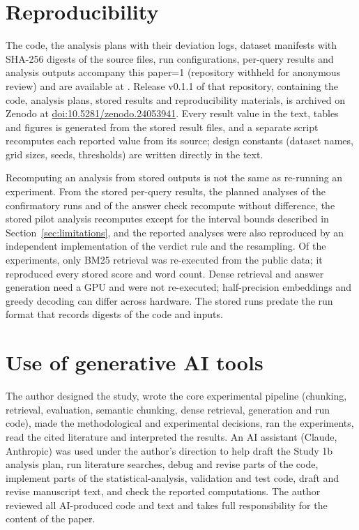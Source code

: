 \documentclass[11pt]{article}
\providecommand{\AnonymousSubmission}{0}
\newcommand*{\CodeURL}{}
\newcommand*{\CodeURL}{https://github.com/swaroopchandjc/rag-research}
\newcommand*{\ArchiveDOI}{10.5281/zenodo.24053941}
\begin{document}
\section{Reproducibility}\label{sec:reproducibility}
The code, the analysis plans with their deviation logs, dataset manifests with SHA-256 digests of the source files, run configurations, per-query results and analysis outputs accompany this paper\ifnum\AnonymousSubmission=1{} (repository withheld for anonymous review)\else{} and are available at \url{\CodeURL}. Release v0.1.1 of that repository, containing the code, analysis plans, stored results and reproducibility materials, is archived on Zenodo at \href{https://doi.org/\ArchiveDOI}{doi:\ArchiveDOI}\fi. Every result value in the text, tables and figures is generated from the stored result files, and a separate script recomputes each reported value from its source; design constants (dataset names, grid sizes, seeds, thresholds) are written directly in the text.

Recomputing an analysis from stored outputs is not the same as re-running an experiment. From the stored per-query results, the planned analyses of the confirmatory runs and of the answer check recompute without difference, the stored pilot analysis recomputes except for the \PilotBounds{} interval bounds described in Section~\ref{sec:limitations}, and the reported analyses were also reproduced by an independent implementation of the verdict rule and the resampling. Of the experiments, only BM25 retrieval was re-executed from the public data; it reproduced every stored score and word count. Dense retrieval and answer generation need a GPU and were not re-executed; half-precision embeddings and greedy decoding can differ across hardware. The stored runs predate the run format that records digests of the code and inputs.

\section*{Use of generative AI tools}
The author designed the study, wrote the core experimental pipeline (chunking, retrieval, evaluation, semantic chunking, dense retrieval, generation and run code), made the methodological and experimental decisions, ran the experiments, read the cited literature and interpreted the results. An AI assistant (Claude, Anthropic) was used under the author's direction to help draft the Study 1b analysis plan, run literature searches, debug and revise parts of the code, implement parts of the statistical-analysis, validation and test code, draft and revise manuscript text, and check the reported computations. The author reviewed all AI-produced code and text and takes full responsibility for the content of the paper.
\end{document}
